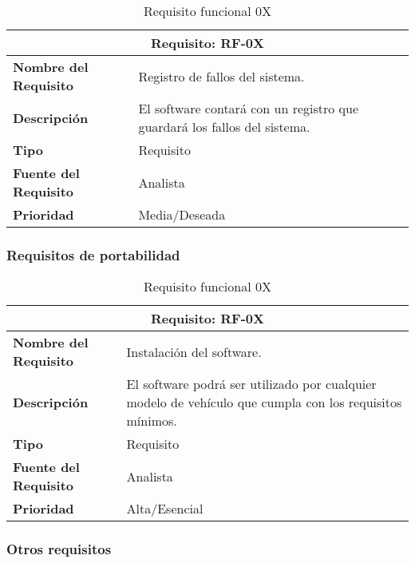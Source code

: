 \begin{table}[H]
\begin{center}
\begin{tabular}{p{} p{7cm}}
\multicolumn{2}{c}{\textbf{Requisito: RF-0X} } \\
\hline \hline
\textbf{Nombre del Requisito} & Registro de fallos del sistema.\\
\hline
\textbf{Descripción} & El software contará con un registro que guardará los fallos del sistema.\\
\hline
\textbf{Tipo} & Requisito  \\
\hline
\textbf{Fuente del Requisito} & Analista  \\
\hline
\textbf{Prioridad} & Media/Deseada \\ \hline
\end{tabular}
\caption{Requisito funcional 0X}
\label{tab:personal}
\end{center}
\end{table}


\subsubsection{Requisitos de portabilidad}

\begin{table}[H]
\begin{center}
\begin{tabular}{p{} p{7cm}}
\multicolumn{2}{c}{\textbf{Requisito: RF-0X} } \\
\hline \hline
\textbf{Nombre del Requisito} & Instalación del software.\\
\hline
\textbf{Descripción} & El software podrá ser utilizado por cualquier modelo de vehículo que cumpla con los requisitos mínimos.\\
\hline
\textbf{Tipo} & Requisito  \\
\hline
\textbf{Fuente del Requisito} & Analista  \\
\hline
\textbf{Prioridad} & Alta/Esencial \\ \hline
\end{tabular}
\caption{Requisito funcional 0X}
\label{tab:personal}
\end{center}
\end{table}


\subsubsection{Otros requisitos}

